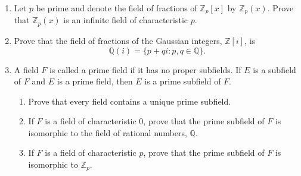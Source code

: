{\begin{enumerate}
\begin{enumerate}
 \item
Prove that the field of fractions of $F[x]$, denoted by
$F(x)$\label{noteratfun},  is isomorphic to the set all rational
expressions $p(x) / q(x)$, where $q(x)$ is not the zero polynomial. 

 \item
Let $p(x_1, \ldots, x_n)$ and $q(x_1, \ldots, x_n)$ be polynomials in
$F[x_1, \ldots, x_n]$. Show that the set of all rational expressions
$p(x_1, \ldots, x_n) / q(x_1, \ldots, x_n)$ is isomorphic to the field
of fractions of $F[x_1, \ldots, x_n]$.  We denote the field of
fractions of $F[x_1, \ldots, x_n]$ by $F(x_1, \ldots,
x_n)$\label{noteratnvar}.    

\end{enumerate}


\item
Let $p$ be prime and denote the field of fractions of ${\mathbb Z}_p[x]$
by ${\mathbb Z}_p(x)$.  Prove that ${\mathbb Z}_p(x)$ is an infinite field
of characteristic $p$. 

 
\item
Prove that the field of fractions of the Gaussian integers, ${\mathbb
Z}[i]$, is 
\[
{\mathbb Q}(i) = \{ p + q i : p, q \in {\mathbb Q}  \}.
\]

 
\item
A field $F$ is called a {\bfi prime
field\/} if it has no proper
subfields. If $E$ is a subfield of $F$ and $E$ is a prime field, then  
$E$ is a {\bfi prime
subfield\/} of $F$. 
\begin{enumerate}
 
 \item
Prove that every field contains a unique prime subfield.
 
 \item
If $F$ is a field of characteristic 0, prove that the prime subfield
of $F$ is isomorphic to the field of rational numbers, ${\mathbb Q}$.
 
 \item
If $F$ is a field of characteristic $p$, prove that the prime subfield
of $F$ is isomorphic to  ${\mathbb Z}_p$. 
 
\end{enumerate}

 






\end{enumerate}}
